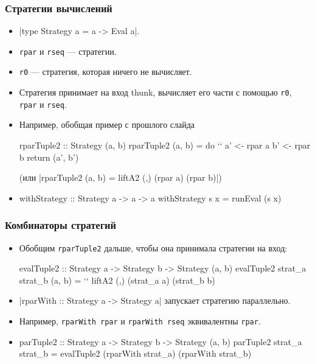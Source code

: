 \documentclass[11pt]{beamer}
\begin{document}
\begin{frame}[fragile]
  \frametitle{Стратегии вычислений}
  \begin{itemize}
    \item \haskinline|type Strategy a = a -> Eval a|.
    \item \lstinline|rpar| и \lstinline|rseq| --- стратегии.
    \item \lstinline|r0| --- стратегия, которая ничего не вычисляет.
    \item Стратегия принимает на вход thunk, вычисляет его части с помощью \lstinline|r0|, \lstinline|rpar| и \lstinline|rseq|.
    \item Например, обобщая пример с прошлого слайда
          \begin{haskell}
rparTuple2 :: Strategy (a, b)
rparTuple2 (a, b) = do `\pause`
  a' <- rpar a
  b' <- rpar b
  return (a', b')
\end{haskell}
          \pause
          (или \haskinline[fontsize=\small]|rparTuple2 (a, b) = liftA2 (,) (rpar a) (rpar b)|)
    \item
          \begin{haskell}
withStrategy :: Strategy a -> a -> a
withStrategy s x = runEval (s x)
\end{haskell}
  \end{itemize}
\end{frame}

\begin{frame}[fragile]
  \frametitle{Комбинаторы стратегий}
  \begin{itemize}
    \item Обобщим \lstinline|rparTuple2| дальше, чтобы она принимала стратегии на вход:
          \begin{haskell}
evalTuple2 :: Strategy a -> Strategy b -> 
  Strategy (a, b)
evalTuple2 strat_a strat_b (a, b) = `\pause` 
  liftA2 (,) (strat_a a) (strat_b b)
    \end{haskell}
          \pause
    \item \haskinline|rparWith :: Strategy a -> Strategy a| запускает стратегию параллельно.
    \item Например, \lstinline|rparWith rpar| и \lstinline|rparWith rseq| эквивалентны \lstinline|rpar|.
          \pause
    \item
          \begin{haskell}
parTuple2 :: Strategy a -> Strategy b -> 
  Strategy (a, b)
parTuple2 strat_a strat_b = 
  evalTuple2 (rparWith strat_a) (rparWith strat_b)
\end{haskell}
  \end{itemize}
\end{frame}
\end{document}
